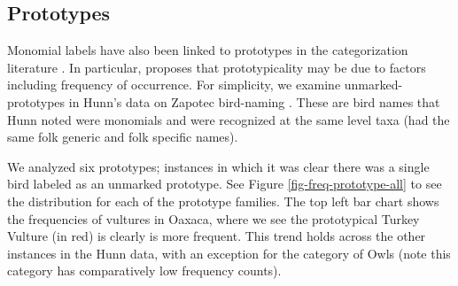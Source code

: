 \documentclass[10pt,letterpaper]{article}
\begin{document}
\subsection{Prototypes}

Monomial labels have also been linked to prototypes in the categorization literature \cite{berlin1972speculations,berlin2014ethnobiological}. In particular,  proposes that prototypicality may be due to factors including frequency of occurrence. For simplicity, we examine unmarked-prototypes in Hunn's data on Zapotec bird-naming  \cite{hunn2008zapotec}. These are bird names that Hunn noted were monomials and were recognized at the same level taxa (had the same folk generic and folk specific names). 

We analyzed six prototypes; instances in which it was clear there was a single bird labeled as an unmarked prototype. See Figure \ref{fig-freq-prototype-all} to see the distribution for each of the prototype families. The top left bar chart shows the frequencies of vultures in Oaxaca, where we see the prototypical Turkey Vulture (in red) is clearly is more frequent. This trend holds across the other instances in the Hunn data, with an exception for the category of Owls (note this category has comparatively low frequency counts).



\end{document}
